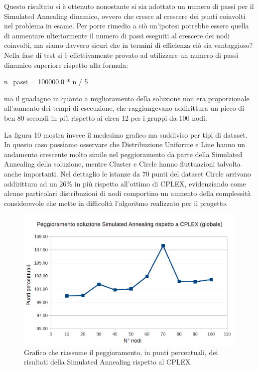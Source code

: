 \documentclass[preprint,12pt]{elsarticle}
\begin{document}
Questo risultato si è ottenuto nonostante si sia adottato un numero di passi per il Simulated Annealing dinamico, ovvero che cresce al crescere dei punti coinvolti nel problema in esame. Per porre rimedio a ciò un'ipotesi potrebbe essere quella di aumentare ulteriormente il numero di passi eseguiti al crescere dei nodi coinvolti, ma siamo davvero sicuri che in termini di efficienza ciò sia vantaggioso? Nella fase di test si è effettivamente provato ad utilizzare un numero di passi dinamico superiore rispetto alla formula:

\begin{center}
n\_passi = 100000.0 * n / 5
\end{center}
ma il guadagno in quanto a miglioramento della soluzione non era proporzionale all'aumento dei tempi di esecuzione, che raggiungevano addirittura un picco di ben 80 secondi in più rispetto ai circa 12 per i gruppi da 100 nodi. 

La figura 10 mostra invece il medesimo grafico ma suddiviso per tipi di dataset. In questo caso possiamo osservare che Distribuzione Uniforme e Line hanno un andamento crescente molto simile nel peggioramento da parte della Simulated Annealing della soluzione, mentre Cluster e Circle hanno fluttuazioni talvolta anche importanti. Nel dettaglio le istanze da 70 punti del dataset Circle arrivano addirittura ad un 26\% in più rispetto all'ottimo di CPLEX, evidenziando come alcune particolari distribuzioni di nodi comportino un aumento della complessità considerevole che mette in difficoltà l'algoritmo realizzato per il progetto. 

\begin{figure}[htbp]
\centering
\includegraphics[scale=0.50]{grafici_confronti/peggioramento_SA_globale.png} 
\caption{Grafico che riassume il peggioramento, in punti percentuali, dei risultati della Simulated Annealing rispetto al CPLEX}\label{fig:9}
\end{figure}
\end{document}
